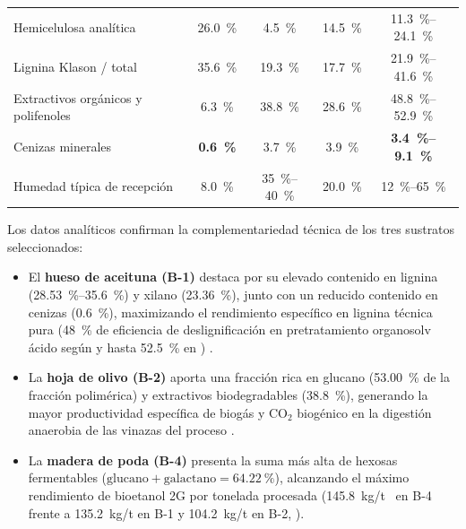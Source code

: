 \documentclass{report}
\begin{document}
\begin{table}[H]
{\begin{tabular}{l c c c | c}
            Hemicelulosa analítica                            & \SI{26.0}{\percent}           & \SI{4.5}{\percent}           & \SI{14.5}{\percent}        & \SI{11.3}{\percent}--\SI{24.1}{\percent} \\
            Lignina Klason / total                            & \SI{35.6}{\percent}           & \SI{19.3}{\percent}          & \SI{17.7}{\percent}        & \SI{21.9}{\percent}--\SI{41.6}{\percent} \\
            Extractivos orgánicos y polifenoles               & \SI{6.3}{\percent}            & \SI{38.8}{\percent}          & \SI{28.6}{\percent}        & \SI{48.8}{\percent}--\SI{52.9}{\percent} \\
            Cenizas minerales                                 & \textbf{\SI{0.6}{\percent}}   & \SI{3.7}{\percent}           & \SI{3.9}{\percent}         & \textbf{\SI{3.4}{\percent}--\SI{9.1}{\percent}} \\
            Humedad típica de recepción                       & \SI{8.0}{\percent}            & \SI{35}{\percent}--\SI{40}{\percent} & \SI{20.0}{\percent} & \SI{12}{\percent}--\SI{65}{\percent} \\
            \bottomrule
        \end{tabular}%
    }
    \label{tab:composicion_comparada}
\end{table}

Los datos analíticos confirman la complementariedad técnica de los tres sustratos seleccionados:
\begin{itemize}
    \item El \textbf{hueso de aceituna (B-1)} destaca por su elevado contenido en lignina (\SI{28.53}{\percent}--\SI{35.6}{\percent}) y xilano (\SI{23.36}{\percent}), junto con un reducido contenido en cenizas (\SI{0.6}{\percent}), maximizando el rendimiento específico en lignina técnica pura (\SI{48}{\percent} de eficiencia de deslignificación en pretratamiento organosolv ácido según \textcite[Sección~3.1]{Jafari-Gohargan2026} y hasta \SI{52.5}{\percent} en \textcite[Tabla~1]{Padilla-Rascon2022}) \autocite{MacArez2025}.
    \item La \textbf{hoja de olivo (B-2)} aporta una fracción rica en glucano (\SI{53.00}{\percent} de la fracción polimérica) y extractivos biodegradables (\SI{38.8}{\percent}), generando la mayor productividad específica de biogás y $\text{CO}_2$ biogénico en la digestión anaerobia de las vinazas del proceso \autocite[Sección~3.1 y Tabla~8]{Jafari-Gohargan2026}.
    \item La \textbf{madera de poda (B-4)} presenta la suma más alta de hexosas fermentables ($\text{glucano} + \text{galactano} = \SI{64.22}{\percent}$), alcanzando el máximo rendimiento de bioetanol 2G por tonelada procesada (\SI{145.8}{\kilo\gram/\tonne{}} en B-4 frente a \SI{135.2}{\kilo\gram/\tonne} en B-1 y \SI{104.2}{\kilo\gram/\tonne} en B-2, \textcite[Tabla~8]{Jafari-Gohargan2026}).
\end{itemize}
\end{document}
